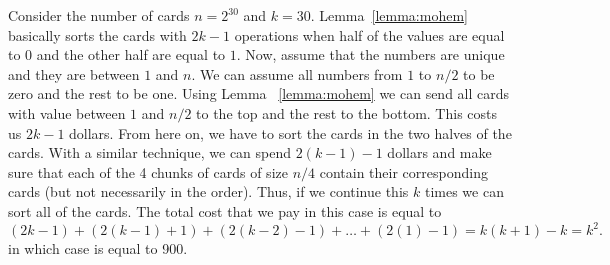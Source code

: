 \begin{solution}
Consider the number of cards $n=2^{30}$ and $k = 30$. Lemma~\ref{lemma:mohem} basically sorts the cards with $2k-1$ operations when half of the values are equal to $0$ and the other half are equal to $1$. Now, assume that the numbers are unique and they are between $1$ and $n$. We can assume all numbers from $1$ to $n/2$ to be zero and the rest to be one. Using Lemma ~\ref{lemma:mohem} we can send all cards with value between $1$ and $n/2$ to the top and the rest to the bottom. This costs us $2k-1$ dollars. From here on, we have to sort the cards in the two halves of the cards. With a similar technique, we can spend $2(k-1)-1$ dollars and make sure that each of the 4 chunks of cards of size $n/4$ contain their corresponding cards (but not necessarily in the order). Thus, if we continue this $k$ times we can sort all of the cards. The total cost that we pay in this case is equal to $$(2k-1) + (2(k-1)+1) + (2(k-2)-1) + \ldots + (2(1)-1) = k(k+1) - k = k^2.$$ in which case is equal to 900. 

\end{solution}
